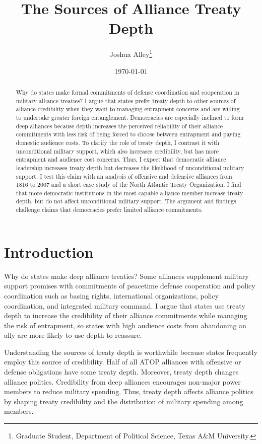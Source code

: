 \documentclass[12pt]{article}
\title{\textbf{The Sources of Alliance Treaty Depth}}
\author{Joshua Alley\footnote{Graduate Student,
Department of Political Science, Texas A\&M University.}}
\date{\today}
\begin{document}
\maketitle 

\doublespace 

\begin{abstract}
Why do states make formal commitments of defense coordination and cooperation in military alliance treaties? 
I argue that states prefer treaty depth to other sources of alliance credibility when they want to managing entrapment concerns and are willing to undertake greater foreign entanglement. 
Democracies are especially inclined to form deep alliances because depth increases the perceived reliability of their alliance commitments with less risk of being forced to choose between entrapment and paying domestic audience costs.
To clarify the role of treaty depth, I contrast it with unconditional military support, which also increases credibility, but has more entrapment and audience cost concerns.
Thus, I expect that democratic alliance leadership increases treaty depth but decreases the likelihood of unconditional military support. 
I test this claim with an analysis of offensive and defensive alliances from 1816 to 2007 and a short case study of the North Atlantic Treaty Organization.
I find that more democratic institutions in the most capable alliance member increase treaty depth, but do not affect unconditional military support.   
The argument and findings challenge claims that democracies prefer limited alliance commitments. 
\end{abstract}


\newpage 


\section{Introduction}


Why do states make deep alliance treaties? 
Some alliances supplement military support promises with commitments of peacetime defense cooperation and policy coordination such as basing rights, international organizations, policy coordination, and integrated military command.
I argue that states use treaty depth to increase the credibility of their alliance commitments while managing the risk of entrapment, so states with high audience costs from abandoning an ally are more likely to use depth to reassure. 

 
Understanding the sources of treaty depth is worthwhile because states frequently employ this source of credibility.
Half of all ATOP alliances with offensive or defense obligations have some treaty depth.
Moreover, treaty depth changes alliance politics. 
Credibility from deep alliances encourages non-major power members to reduce military spending.  
Thus, treaty depth affects alliance politics by shaping treaty credibility and the distribution of military spending among members. 
\end{document}
